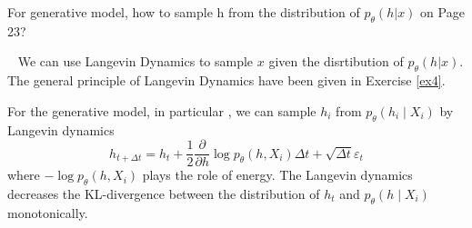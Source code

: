 \begin{exercise}[]{For generative model, how to sample h from the distribution of $p_\theta(h|x)$ on Page 23?}
  \begin{solution}
  \par{~}
  We can use Langevin Dynamics to sample $x$ given the disrtibution of $p_\theta(h|x)$. The general principle of Langevin Dynamics have been given in Exercise \ref{ex4}.

  For the generative model, in particular , we can sample $h_{i}$ from $p_{\theta}\left(h_{i} \mid X_{i}\right)$ by Langevin dynamics
  \begin{equation}
    h_{t+\Delta t}=h_{t}+\frac{1}{2} \frac{\partial}{\partial h} \log p_{\theta}\left(h, X_{i}\right) \Delta t+\sqrt{\Delta t} \varepsilon_{t}
  \end{equation}
  where $-\log p_{\theta}\left(h, X_{i}\right)$ plays the role of energy. The Langevin dynamics decreases the KL-divergence between the distribution of $h_{t}$ and $p_{\theta}\left(h \mid X_{i}\right)$ monotonically.

  \end{solution}
  \label{ex5}
\end{exercise}

 